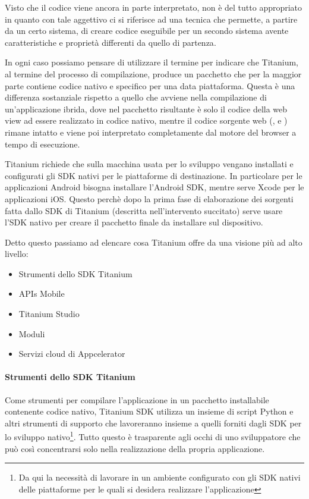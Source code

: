 			Visto che il codice \js{} viene ancora in parte interpretato, 
			\crosscomp{} non è del tutto appropriato in quanto con tale 
			aggettivo ci si riferisce ad una tecnica che permette, a partire da 
			un certo sistema, di creare codice eseguibile per un secondo sistema 
			avente caratteristiche e proprietà differenti da quello di 
			partenza\citep{Web:Wiki.cross-compiling}.
			
			In ogni caso possiamo pensare di utilizzare il termine 
			\crosscomp{} per indicare che Titanium, al termine del processo di 
			compilazione, produce un pacchetto che per la 
			maggior parte contiene codice nativo e specifico per una data 
			piattaforma. Questa è una differenza sostanziale rispetto a quello 
			che avviene nella compilazione di un'applicazione ibrida, dove nel 
			pacchetto risultante è solo il codice della web view ad essere 
			realizzato in codice nativo, mentre il codice sorgente web 
			(\js{}, \html{} e \css{}) rimane intatto e viene poi interpretato 
			completamente dal motore del browser a tempo di esecuzione.
			
			Titanium richiede che sulla macchina usata per lo sviluppo vengano 
			installati e configurati gli SDK nativi per le piattaforme di 
			destinazione. In particolare per le applicazioni Android bisogna 
			installare l'Android SDK, mentre serve Xcode per le applicazioni 
			iOS. Questo perchè dopo la prima fase di elaborazione dei sorgenti 
			fatta dallo SDK di Titanium (descritta nell'intervento succitato) 
			serve usare l'SDK nativo per creare il pacchetto finale da 
			installare sul dispositivo.
			
			\clearpage
			\noindent Detto questo passiamo ad elencare cosa Titanium offre da 
			una visione più ad alto livello\citep[Cap.2 - Titanium 
			Mobile Overview]{Book:Ti}:
			\begin{itemize}
				\item Strumenti dello SDK Titanium
				\item APIs Mobile
				\item Titanium Studio
				\item Moduli
				\item Servizi cloud di Appcelerator
			\end{itemize}
	
			\paragraph{Strumenti dello SDK Titanium}
				Come strumenti per compilare l'applicazione in un pacchetto 
				installabile contenente codice nativo, Titanium SDK utilizza un 
				insieme di script Python e altri strumenti di supporto che 
				lavoreranno insieme a quelli forniti dagli SDK per lo sviluppo 
				nativo\footnote{Da qui la necessità di lavorare in un ambiente 
				configurato con gli SDK nativi delle piattaforme per le quali si 
				desidera realizzare l'applicazione}. Tutto questo è trasparente 
				agli occhi di uno sviluppatore che può così concentrarsi solo 
				nella realizzazione della propria applicazione.
				
